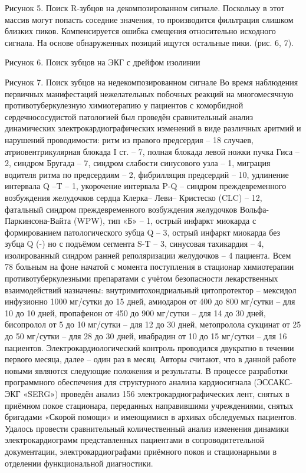\documentclass[runningheads]{AIIT}
\begin{document}
Рисунок 5. Поиск R-зубцов на декомпозированном сигнале.
Поскольку в этот массив могут попасть соседние значения, то производится фильтрация слишком близких пиков. Компенсируется ошибка смещения относительно исходного сигнала. На основе обнаруженных позиций ищутся остальные пики. (рис. 6, 7).

Рисунок 6. Поиск зубцов на ЭКГ с дрейфом изолинии

Рисунок 7. Поиск зубцов на недекомпозированном сигнале
 Во время  наблюдения  первичных манифестаций нежелательных побочных реакций на многомесячную противотуберкулезную химиотерапию у пациентов с коморбидной сердечнососудистой патологией был проведён сравнительный анализ динамических электрокардиографических изменений в виде различных аритмий и нарушений проводимости: ритм из правого предсердия – 18 случаев, атриовентрикулярная блокада I ст. – 7, полная блокада левой ножки пучка Гиса – 2, синдром Бругада – 7, синдром слабости синусового узла – 1, миграция водителя ритма по предсердиям – 2, фибрилляция предсердий – 10, удлинение интервала Q –T – 1, укорочение интервала P-Q – синдром  преждевременного возбуждения желудочков сердца Клерка– Леви– Кристеско (CLC) – 12, фатальный синдром  преждевременного возбуждения желудочков  Вольфа-Паркинсона-Вайта (WPW), тип «Б» – 1, острый инфаркт миокарда с формированием патологического зубца Q – 3, острый инфаркт миокарда без зубца Q (-) но с подъёмом сегмента S-T – 3, синусовая тахикардия – 4, изолированный синдром ранней реполяризации желудочков  – 4 пациента.
Всем 78 больным на фоне начатой с момента поступления в стационар химиотерапии противотуберкулезными препаратами с учётом безопасности лекарственных взаимодействий назначены: внутримитохондриальный цитопротектор – мексидол инфузионно 1000 мг/сутки до 15 дней, амиодарон от 400 до 800 мг/сутки – для 10 до 10 дней, пропафенон от 450 до 900 мг/сутки – для 14 до 30 дней, бисопролол от 5 до 10 мг/сутки – для 12 до 30 дней, метопролола сукцинат от 25 до 50 мг/сутки  – для 28 до 30 дней, ивабрадин от 10 до 15 мг/сутки – для 16 пациентов. Электрокардиологический контроль проводился двукратно в течении первого месяца, далее – один раз в месяц.
Авторы считают, что в данной работе новыми являются следующие положения и результаты.
В процессе разработки программного обеспечения для структурного анализа кардиосигнала (ЭССАКС-ЭКГ «SERG») проведён анализ 156 электрокардиографических лент, снятых в приёмном покое стационара, переданных направившими учреждениями, снятых бригадами «Скорой помощи» и имеющимися в архивах обследуемых пациентов.
Удалось провести сравнительный количественный анализ изменения динамики электрокардиограмм представленных пациентами в сопроводитетельной документации, электрокардиографами приёмного покоя и стационарными в отделении функциональной диагностики.
\end{document}
